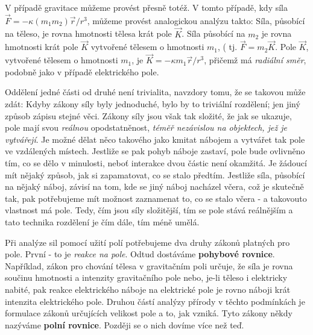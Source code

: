 {    V případě gravitace můžeme provést přesně totéž. V tomto případě, kdy síla \(\vec{F} = - \kappa 
    (m_1m_2)\vec{r}/r^3\), můžeme provést analogickou analýzu takto: Síla, působící na těleso, je 
    rovna hmotnosti tělesa krát pole \(\vec{K}\). Síla působící na \(m_2\) je rovna hmotnosti krát 
    pole \(\vec{K}\) vytvořené tělesem o hmotnosti \(m_1\), ( tj. \(\vec{F}=m_2\vec{K}\). Pole 
    \(\vec{K}\), vytvořené tělesem o hmotnosti \(m_1\), je \(\vec{K}= -\kappa m_1\vec{r}/r^3\), 
    přičemž má \emph{radiální směr}, podobně jako v případě elektrického pole.
    
    Oddělení jedné části od druhé není trivialita, navzdory tomu, že se takovou může zdát: Kdyby 
    zákony síly byly jednoduché, bylo by to triviální rozdělení; jen jiný způsob zápisu stejné 
    věci. Zákony síly jsou však tak složité, že jak se ukazuje, pole mají svou \emph{reálnou} 
    opodstatněnost, \emph{téměř nezávislou na objektech, jež je vytvářejí}. Je možné dělat něco 
    takového jako kmitat nábojem a vytvářet tak pole ve vzdálených místech. Jestliže se pak pohyb 
    náboje zastaví, pole bude ovlivněno tím, co se dělo v minulosti, neboť interakce dvou částic 
    není okamžitá. Je žádoucí mít nějaký způsob, jak si zapamatovat, co se stalo předtím. Jestliže 
    síla, působící na nějaký náboj, závisí na tom, kde se jiný náboj nacházel včera, což je 
    skutečně tak, pak potřebujeme mít možnost zaznamenat to, co se stalo včera - a takovouto 
    vlastnost má pole. Tedy, čím jsou síly složitější, tím se pole stává reálnějším a tato technika 
    rozdělení je čím dále, tím méně umělá.
    
    Při analýze sil pomocí užití polí potřebujeme dva druhy zákonů platných pro pole. První - to je 
    \emph{reakce na pole}. Odtud dostáváme \textbf{pohybové rovnice}. Například, zákon pro chování 
    tělesa v gravitačním poli určuje, že síla je rovna součinu hmotnosti a intenzity gravitačního 
    pole nebo, je-li těleso i elektricky nabité, pak reakce elektrického náboje na elektrické pole 
    je rovno náboji krát intenzita elektrického pole. Druhou částí analýzy přírody v těchto 
    podmínkách je formulace zákonů určujících velikost pole a to, jak vzniká. Tyto zákony někdy 
    nazýváme \textbf{polní rovnice}. Později se o nich dovíme více než teď.
    
}
